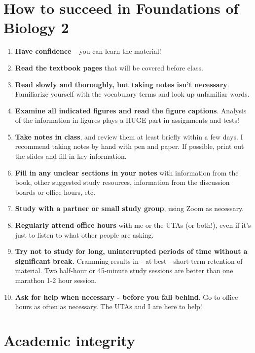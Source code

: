 \documentclass[
]{book}
\providecommand{\tightlist}{%
  \setlength{\itemsep}{0pt}\setlength{\parskip}{0pt}}
\begin{document}
\hypertarget{how-to-succeed-in-foundations-of-biology-2}{%
\chapter{How to succeed in Foundations of Biology 2}\label{how-to-succeed-in-foundations-of-biology-2}}

\begin{enumerate}
\def\labelenumi{\arabic{enumi}.}
\tightlist
\item
  \textbf{Have confidence} -- you can learn the material!\\
\item
  \textbf{Read the textbook pages} that will be covered before class.
\item
  \textbf{Read slowly and thoroughly, but taking notes isn't necessary}. Familiarize yourself with the vocabulary terms and look up unfamiliar words.
\item
  \textbf{Examine all indicated figures and read the figure captions}. Analysis of the information in figures plays a HUGE part in assignments and tests!
\item
  \textbf{Take notes in class}, and review them at least briefly within a few days. I recommend taking notes by hand with pen and paper. If possible, print out the slides and fill in key information.
\item
  \textbf{Fill in any unclear sections in your notes} with information from the book, other suggested study resources, information from the discussion boards or office hours, etc.
\item
  \textbf{Study with a partner or small study group}, using Zoom as necessary.
\item
  \textbf{Regularly attend office hours} with me or the UTAs (or both!), even if it's just to listen to what other people are asking.
\item
  \textbf{Try not to study for long, uninterrupted periods of time without a significant break.} Cramming results in - at best - short term retention of material. Two half-hour or 45-minute study sessions are better than one marathon 1-2 hour session.
\item
  \textbf{Ask for help when necessary - before you fall behind}. Go to office hours as often as necessary. The UTAs and I are here to help!
\end{enumerate}

\hypertarget{academic-integrity}{%
\chapter{Academic integrity}\label{academic-integrity}}
\end{document}
